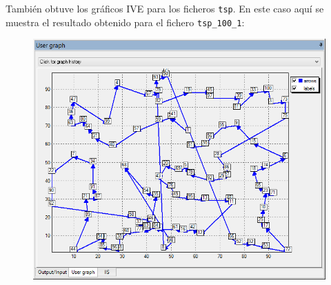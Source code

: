\documentclass[a4paper,11pt]{article}
\begin{document}
\clearpage
También obtuve los gráficos IVE para los ficheros \texttt{tsp}. En este caso aquí se muestra el resultado obtenido para el fichero \texttt{tsp\_100\_1}:

\begin{figure}[!htbp]
	\centering
	\includegraphics[width=1.0\textwidth]{entorno_100_1.png}
\end{figure}
\end{document}
